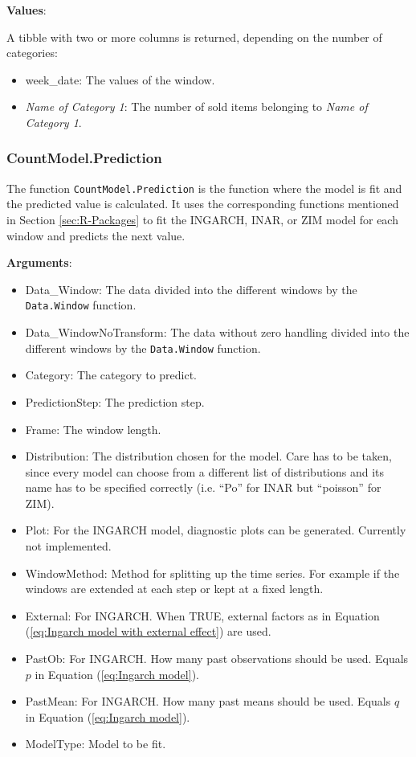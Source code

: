 \textbf{Values}:

A tibble with two or more columns is returned, depending on the number of categories: 

\begin{itemize}
	\item week\_date: The values of the window.
	\item \textit{Name of Category 1}: The number of sold items belonging to \textit{Name of Category 1}.
\end{itemize}

\subsubsection{CountModel.Prediction}
\label{sec:CountModel.Prediction}

The function \texttt{CountModel.Prediction} is the function where the model is fit and the predicted value is calculated. It uses the corresponding functions mentioned in Section \ref{sec:R-Packages} to fit the INGARCH, INAR, or ZIM model for each window and predicts the next value. 

\textbf{Arguments}:

\begin{itemize}
	\item Data\_Window: The data divided into the different windows by the \texttt{Data.Window} function.
	\item Data\_WindowNoTransform: The data without zero handling divided into the different windows by the \texttt{Data.Window} function.
  \item Category: The category to predict. 
  \item PredictionStep: The prediction step.
  \item Frame: The window length.
  \item Distribution: The distribution chosen for the model. Care has to be taken, since every model can choose from a different list of distributions and its name has to be specified correctly (i.e. "`Po"' for INAR but "`poisson"' for ZIM). 
  \item Plot: For the INGARCH model, diagnostic plots can be generated. Currently not implemented.
  \item WindowMethod: Method for splitting up the time series. For example if the windows are extended at each step or kept at a fixed length.
  \item External: For INGARCH. When TRUE, external factors as in Equation (\ref{eq:Ingarch model with external effect}) are used.
  \item PastOb: For INGARCH. How many past observations should be used. Equals $p$ in Equation (\ref{eq:Ingarch model}).
  \item PastMean: For INGARCH. How many past means should be used. Equals $q$ in Equation (\ref{eq:Ingarch model}).
  \item ModelType: Model to be fit. 
\end{itemize}

